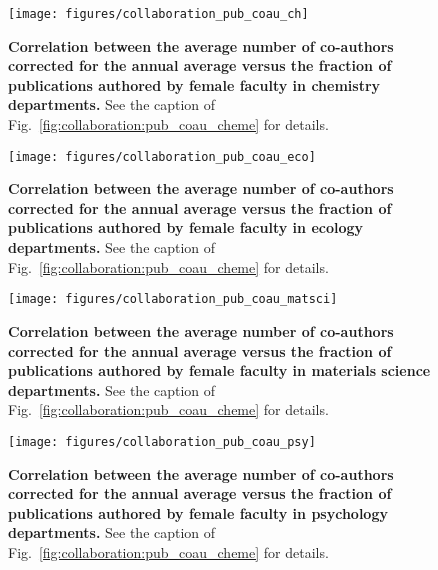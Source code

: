 \clearpage

\begin{figure}[t]
\texttt{[image: figures/collaboration\_pub\_coau\_ch]}
\caption[Average co-authors and publications in chemistry.]{\textbf{Correlation between the average number of co-authors corrected for the annual average versus the fraction of publications authored by female faculty in chemistry departments.} See the caption of Fig.~\ref{fig:collaboration:pub_coau_cheme} for details.}
\label{fig:collaboration:pub_coau_ch}
\end{figure}

\clearpage

\begin{figure}[t]
\texttt{[image: figures/collaboration\_pub\_coau\_eco]}
\caption[Average co-authors and publications in ecology.]{\textbf{Correlation between the average number of co-authors corrected for the annual average versus the fraction of publications authored by female faculty in ecology departments.} See the caption of Fig.~\ref{fig:collaboration:pub_coau_cheme} for details.}
\label{fig:collaboration:pub_coau_eco}
\end{figure}

\clearpage

\begin{figure}[t]
\texttt{[image: figures/collaboration\_pub\_coau\_matsci]}
\caption[Average co-authors and publications in material science.]{\textbf{Correlation between the average number of co-authors corrected for the annual average versus the fraction of publications authored by female faculty in materials science departments.} See the caption of Fig.~\ref{fig:collaboration:pub_coau_cheme} for details.}
\label{fig:collaboration:pub_coau_matsci}
\end{figure}

\clearpage

\begin{figure}[t]
\texttt{[image: figures/collaboration\_pub\_coau\_psy]}
\caption[Average co-authors and publications in psychology.]{\textbf{Correlation between the average number of co-authors corrected for the annual average versus the fraction of publications authored by female faculty in psychology departments.} See the caption of Fig.~\ref{fig:collaboration:pub_coau_cheme} for details.}
\label{fig:collaboration:pub_coau_psy}
\end{figure}

\clearpage


